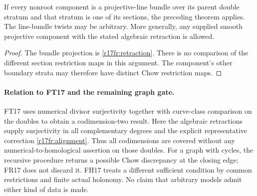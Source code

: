 \begin{corollary}
If every nonroot component is a projective-line bundle
over its parent double stratum and that stratum is one
of its sections, the preceding theorem applies.
The line-bundle twists may be arbitrary.  More generally,
any supplied smooth projective component with the stated
algebraic retraction is allowed.
\end{corollary}

\begin{proof}
The bundle projection is \eqref{r17fr:retraction}.
There is no comparison of the different section
restriction maps in this argument.  The component's
other boundary strata may therefore have distinct
Chow restriction maps.
\end{proof}

\paragraph{Relation to FT17 and the remaining graph gate.}
FT17 uses numerical divisor surjectivity together with
curve-class comparison on the doubles to obtain a
codimension-two result.  Here the algebraic retractions
supply surjectivity in all complementary degrees and
the explicit representative correction
\eqref{r17fr:alignment}.  Thus all codimensions are covered
without any numerical-to-homological assertion on those
doubles.  For a graph with cycles, the recursive procedure
returns a possible Chow discrepancy at the closing edge;
FR17 does not discard it.  FH17 treats a different sufficient
condition by common restrictions and finite actual holonomy.
No claim that arbitrary models admit either kind of data is made.
